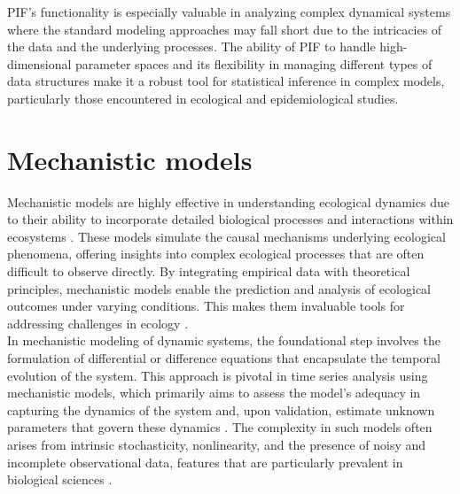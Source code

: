 \documentclass[12pt]{article}
\begin{document}
PIF's functionality is especially valuable in analyzing complex dynamical systems where the standard modeling approaches may fall short due to the intricacies of the data and the underlying processes. The ability of PIF to handle high-dimensional parameter spaces and its flexibility in managing different types of data structures make it a robust tool for statistical inference in complex models, particularly those encountered in ecological and epidemiological studies.\\

\section{Mechanistic models}
\label{sec:mecmod}
Mechanistic models are highly effective in understanding ecological dynamics due to their ability to incorporate detailed biological processes and interactions within ecosystems \cite{young1998data}. These models simulate the causal mechanisms underlying ecological phenomena, offering insights into complex ecological processes that are often difficult to observe directly. By integrating empirical data with theoretical principles, mechanistic models enable the prediction and analysis of ecological outcomes under varying conditions. This makes them invaluable tools for addressing challenges in ecology \cite{mouquet2015predictive}.\\


In mechanistic modeling of dynamic systems, the foundational step involves the formulation of differential or difference equations that encapsulate the temporal evolution of the system. This approach is pivotal in time series analysis using mechanistic models, which primarily aims to assess the model's adequacy in capturing the dynamics of the system and, upon validation, estimate unknown parameters that govern these dynamics \cite{breto2009time}. The complexity in such models often arises from intrinsic stochasticity, nonlinearity, and the presence of noisy and incomplete observational data, features that are particularly prevalent in biological sciences \cite{wilkinson2018stochastic}.\\
\end{document}
